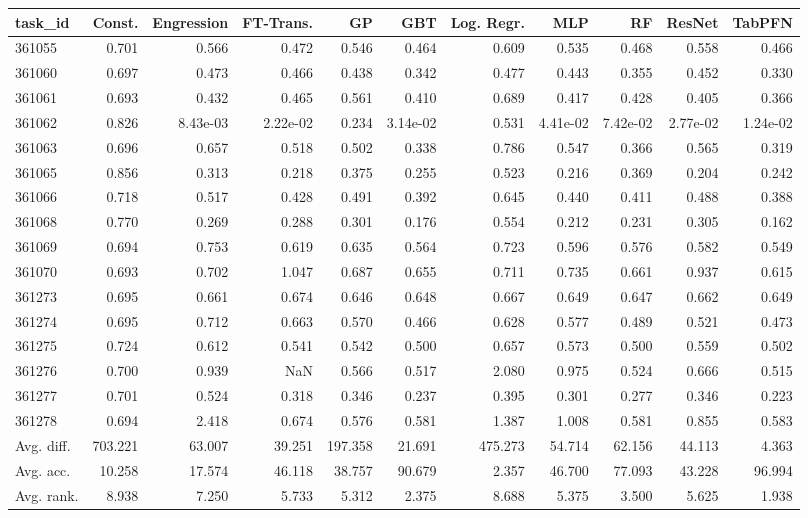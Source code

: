 \begin{tabular}{lrrrrrrrrrr}
\toprule
task\_id & Const. & Engression & FT-Trans. & GP & GBT & Log. Regr. & MLP & RF & ResNet & TabPFN \\
\midrule
361055 & 0.701 & 0.566 & 0.472 & 0.546 & 0.464 & 0.609 & 0.535 & 0.468 & 0.558 & 0.466 \\
361060 & 0.697 & 0.473 & 0.466 & 0.438 & 0.342 & 0.477 & 0.443 & 0.355 & 0.452 & 0.330 \\
361061 & 0.693 & 0.432 & 0.465 & 0.561 & 0.410 & 0.689 & 0.417 & 0.428 & 0.405 & 0.366 \\
361062 & 0.826 & 8.43e-03 & 2.22e-02 & 0.234 & 3.14e-02 & 0.531 & 4.41e-02 & 7.42e-02 & 2.77e-02 & 1.24e-02 \\
361063 & 0.696 & 0.657 & 0.518 & 0.502 & 0.338 & 0.786 & 0.547 & 0.366 & 0.565 & 0.319 \\
361065 & 0.856 & 0.313 & 0.218 & 0.375 & 0.255 & 0.523 & 0.216 & 0.369 & 0.204 & 0.242 \\
361066 & 0.718 & 0.517 & 0.428 & 0.491 & 0.392 & 0.645 & 0.440 & 0.411 & 0.488 & 0.388 \\
361068 & 0.770 & 0.269 & 0.288 & 0.301 & 0.176 & 0.554 & 0.212 & 0.231 & 0.305 & 0.162 \\
361069 & 0.694 & 0.753 & 0.619 & 0.635 & 0.564 & 0.723 & 0.596 & 0.576 & 0.582 & 0.549 \\
361070 & 0.693 & 0.702 & 1.047 & 0.687 & 0.655 & 0.711 & 0.735 & 0.661 & 0.937 & 0.615 \\
361273 & 0.695 & 0.661 & 0.674 & 0.646 & 0.648 & 0.667 & 0.649 & 0.647 & 0.662 & 0.649 \\
361274 & 0.695 & 0.712 & 0.663 & 0.570 & 0.466 & 0.628 & 0.577 & 0.489 & 0.521 & 0.473 \\
361275 & 0.724 & 0.612 & 0.541 & 0.542 & 0.500 & 0.657 & 0.573 & 0.500 & 0.559 & 0.502 \\
361276 & 0.700 & 0.939 & NaN & 0.566 & 0.517 & 2.080 & 0.975 & 0.524 & 0.666 & 0.515 \\
361277 & 0.701 & 0.524 & 0.318 & 0.346 & 0.237 & 0.395 & 0.301 & 0.277 & 0.346 & 0.223 \\
361278 & 0.694 & 2.418 & 0.674 & 0.576 & 0.581 & 1.387 & 1.008 & 0.581 & 0.855 & 0.583 \\
Avg. diff. & 703.221 & 63.007 & 39.251 & 197.358 & 21.691 & 475.273 & 54.714 & 62.156 & 44.113 & 4.363 \\
Avg. acc. & 10.258 & 17.574 & 46.118 & 38.757 & 90.679 & 2.357 & 46.700 & 77.093 & 43.228 & 96.994 \\
Avg. rank. & 8.938 & 7.250 & 5.733 & 5.312 & 2.375 & 8.688 & 5.375 & 3.500 & 5.625 & 1.938 \\
\bottomrule
\end{tabular}
